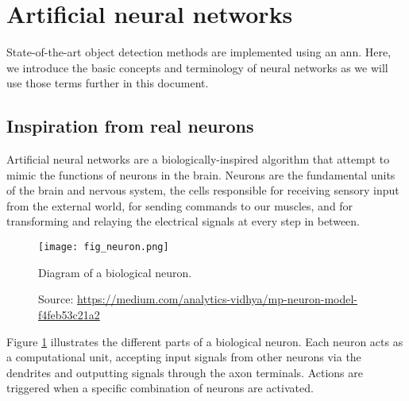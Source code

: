 \section{Artificial neural networks}
State-of-the-art object detection methods are implemented using an \acrfull{ann}. Here, we introduce the basic concepts and terminology of neural networks as we will use those terms further in this document. 

\subsection{Inspiration from real neurons}
Artificial neural networks are a biologically-inspired algorithm that attempt to mimic the functions of neurons in the brain. Neurons are the fundamental units of the brain and nervous system, the cells responsible for receiving sensory input from the external world, for sending commands to our muscles, and for transforming and relaying the electrical signals at every step in between.
\begin{figure}[ht]
    \texttt{[image: fig\_neuron.png]}
    \caption[Diagram of a biological neuron]{Diagram of a biological neuron.}
    \caption*{Source: \href{ https://medium.com/analytics-vidhya/mp-neuron-model-f4feb53c21a2}{https://medium.com/analytics-vidhya/mp-neuron-model-f4feb53c21a2}}
    \label{fig:neuron}
\end{figure}
Figure \ref{fig:neuron} illustrates the different parts of a biological neuron.
Each neuron acts as a computational unit, accepting input signals from other neurons via the dendrites and outputting signals through the axon terminals. Actions are triggered when a specific combination of neurons are activated.

